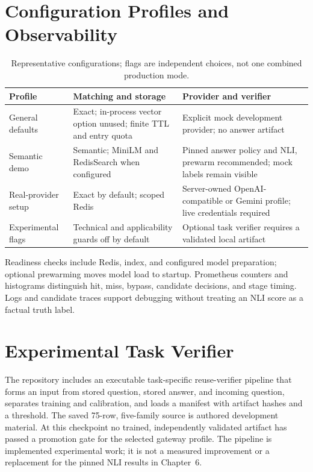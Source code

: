 \section{Configuration Profiles and Observability}
\begin{table}[htbp]\centering\small
\caption{Representative configurations; flags are independent choices, not one combined production mode.}\label{tab:config}
\begin{tabular}{p{2.5cm}p{3.5cm}p{4.5cm}}\toprule
Profile & Matching and storage & Provider and verifier \\\midrule
General defaults & Exact; in-process vector option unused; finite TTL and entry quota & Explicit mock development provider; no answer artifact \\
Semantic demo & Semantic; MiniLM and RedisSearch when configured & Pinned answer policy and NLI, prewarm recommended; mock labels remain visible \\
Real-provider setup & Exact by default; scoped Redis & Server-owned OpenAI-compatible or Gemini profile; live credentials required \\
Experimental flags & Technical and applicability guards off by default & Optional task verifier requires a validated local artifact \\\bottomrule
\end{tabular}
\end{table}

Readiness checks include Redis, index, and configured model preparation; optional prewarming moves model load to startup. Prometheus counters and histograms \cite{prometheus} distinguish hit, miss, bypass, candidate decisions, and stage timing. Logs and candidate traces support debugging without treating an NLI score as a factual truth label.

\section{Experimental Task Verifier}
The repository includes an executable task-specific reuse-verifier pipeline that forms an input from stored question, stored answer, and incoming question, separates training and calibration, and loads a manifest with artifact hashes and a threshold. The saved 75-row, five-family source is authored development material. At this checkpoint no trained, independently validated artifact has passed a promotion gate for the selected gateway profile. The pipeline is implemented experimental work; it is not a measured improvement or a replacement for the pinned NLI results in Chapter~6.


